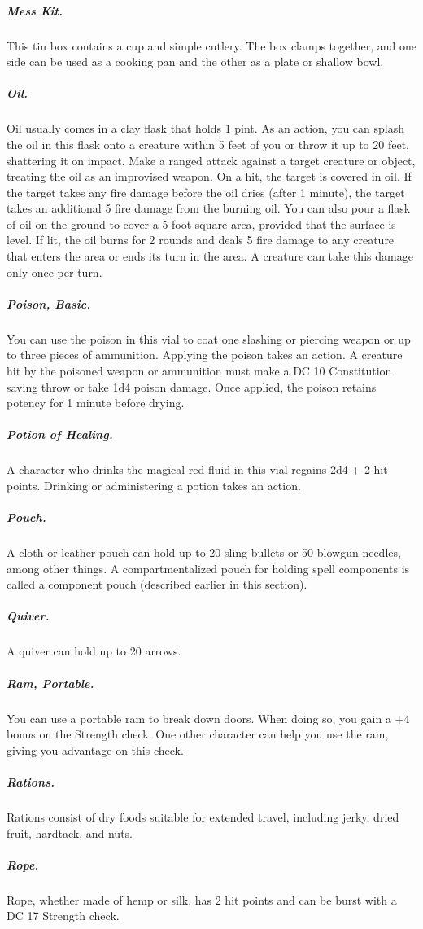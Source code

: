 \subparagraph*{Mess Kit.} This tin box contains a cup and simple cutlery. The box clamps together, and one side can be used as a cooking pan and the other as a plate or shallow bowl.

\subparagraph*{Oil.} Oil usually comes in a clay flask that holds 1 pint. As an action, you can splash the oil in this flask onto a creature within 5 feet of you or throw it up to 20 feet, shattering it on impact. Make a ranged attack against a target creature or object, treating the oil as an improvised weapon. On a hit, the target is covered in oil. If the target takes any fire damage before the oil dries (after 1 minute), the target takes an additional 5 fire damage from the burning oil. You can also pour a flask of oil on the ground to cover a 5-foot-square area, provided that the surface is level. If lit, the oil burns for 2 rounds and deals 5 fire damage to any creature that enters the area or ends its turn in the area. A creature can take this damage only once per turn.

\subparagraph*{Poison, Basic.} You can use the poison in this vial to coat one slashing or piercing weapon or up to three pieces of ammunition. Applying the poison takes an action. A creature hit by the poisoned weapon or ammunition must make a DC 10 Constitution saving throw or take 1d4 poison damage. Once applied, the poison retains potency for 1 minute before drying.

\subparagraph*{Potion of Healing.} A character who drinks the magical red fluid in this vial regains 2d4 + 2 hit points. Drinking or administering a potion takes an action.

\subparagraph*{Pouch.} A cloth or leather pouch can hold up to 20 sling bullets or 50 blowgun needles, among other things. A compartmentalized pouch for holding spell components is called a component pouch (described earlier in this section). 

\subparagraph*{Quiver.} A quiver can hold up to 20 arrows.

\subparagraph*{Ram, Portable.} You can use a portable ram to break down doors. When doing so, you gain a +4 bonus on the Strength check. One other character can help you use the ram, giving you advantage on this check.

\subparagraph*{Rations.} Rations consist of dry foods suitable for extended travel, including jerky, dried fruit, hardtack, and nuts.

\subparagraph*{Rope.} Rope, whether made of hemp or silk, has 2 hit points and can be burst with a DC 17 Strength check.

